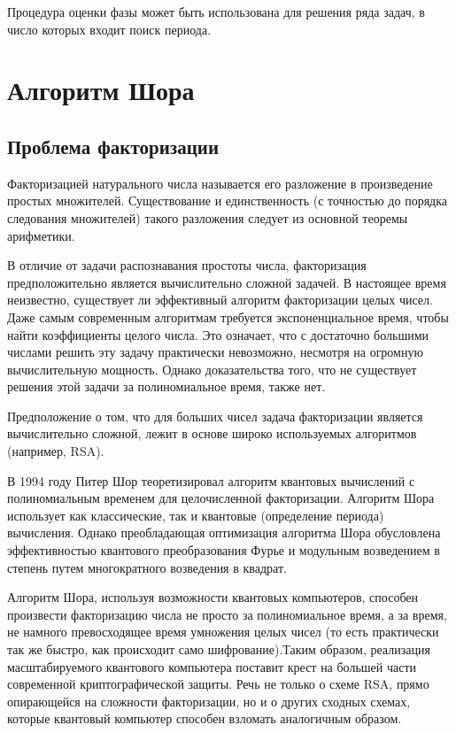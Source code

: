 \documentclass[14pt]{article}
\begin{document}
Процедура оценки фазы может быть использована для решения ряда задач, в число которых входит поиск периода.
	
	\newpage
	\section{Алгоритм Шора}	
	\subsection{Проблема факторизации}
	Факторизацией натурального числа называется его разложение в произведение простых множителей. Существование и единственность (с точностью до порядка следования множителей) такого разложения следует из основной теоремы арифметики.

В отличие от задачи распознавания простоты числа, факторизация предположительно является вычислительно сложной задачей. В настоящее время неизвестно, существует ли эффективный алгоритм факторизации целых чисел. Даже самым современным алгоритмам требуется экспоненциальное время, чтобы найти коэффициенты целого числа. Это означает, что с достаточно большими числами решить эту задачу практически невозможно, несмотря на огромную вычислительную мощность. Однако доказательства того, что не существует решения этой задачи за полиномиальное время, также нет.

Предположение о том, что для больших чисел задача факторизации является вычислительно сложной, лежит в основе широко используемых алгоритмов (например, RSA).

В 1994 году Питер Шор теоретизировал алгоритм квантовых вычислений с полиномиальным временем для целочисленной факторизации. Алгоритм Шора использует как классические, так и квантовые (определение периода) вычисления. Однако преобладающая оптимизация алгоритма Шора обусловлена эффективностью квантового преобразования Фурье и модульным возведением в степень путем многократного возведения в квадрат.

Алгоритм Шора, используя возможности квантовых компьютеров, способен произвести факторизацию числа не просто за полиномиальное время, а за время, не намного превосходящее время умножения целых чисел (то есть практически так же быстро, как происходит само шифрование).Таким образом, реализация масштабируемого квантового компьютера поставит крест на большей части современной криптографической защиты. Речь не только о схеме RSA, прямо опирающейся на сложности факторизации, но и о других сходных схемах, которые квантовый компьютер способен взломать аналогичным образом.
\end{document}
